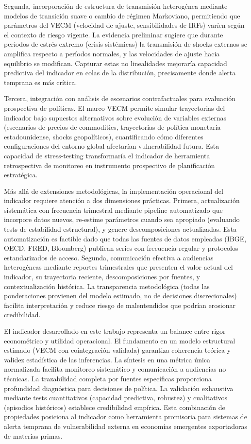 \documentclass[3p,11pt,draft,natbib=false]{elsarticle}
\begin{document}
Segunda, incorporación de estructura de transmisión heterogénea mediante modelos de transición suave o cambio de régimen Markoviano, permitiendo que parámetros del VECM (velocidad de ajuste, sensibilidades de IRFs) varíen según el contexto de riesgo vigente. La evidencia preliminar sugiere que durante períodos de estrés extremo (crisis sistémicas) la transmisión de shocks externos se amplifica respecto a períodos normales, y las velocidades de ajuste hacia equilibrio se modifican. Capturar estas no linealidades mejoraría capacidad predictiva del indicador en colas de la distribución, precisamente donde alerta temprana es más crítica.

Tercera, integración con análisis de escenarios contrafactuales para evaluación prospectiva de políticas. El marco VECM permite simular trayectorias del indicador bajo supuestos alternativos sobre evolución de variables externas (escenarios de precios de commodities, trayectorias de política monetaria estadounidense, shocks geopolíticos), cuantificando cómo diferentes configuraciones del entorno global afectarían vulnerabilidad futura. Esta capacidad de stress-testing transformaría el indicador de herramienta retrospectiva de monitoreo en instrumento prospectivo de planificación estratégica.

Más allá de extensiones metodológicas, la implementación operacional del indicador requiere atención a dos dimensiones prácticas. Primera, actualización sistemática con frecuencia trimestral mediante pipeline automatizado que incorpore datos nuevos, re-estime parámetros cuando sea apropiado (evaluando tests de estabilidad estructural), y genere descomposiciones actualizadas. Esta automatización es factible dado que todas las fuentes de datos empleadas (IBGE, OECD, FRED, Bloomberg) publican series con frecuencia regular y protocolos estandarizados de acceso. Segunda, comunicación efectiva a audiencias heterogéneas mediante reportes trimestrales que presenten el valor actual del indicador, su trayectoria reciente, descomposiciones por fuentes, y contextualización histórica. La transparencia metodológica (todas las ponderaciones provienen del modelo estimado, no de decisiones discrecionales) facilita interpretación y reduce riesgo de malentendidos que podrían erosionar credibilidad.

El indicador desarrollado en este trabajo representa un balance entre rigor econométrico y utilidad operacional. El fundamento en un modelo estructural estimado (VECM con cointegración validada) garantiza coherencia teórica y validez estadística de las inferencias. La síntesis en una métrica única normalizada facilita monitoreo sistemático y comunicación a audiencias no técnicas. La trazabilidad completa por fuentes específicas proporciona profundidad diagnóstica para decisiones de política. La validación exhaustiva mediante tests cuantitativos (capacidad predictiva, robustez) y cualitativos (episodios históricos) establece credibilidad empírica. Esta combinación de propiedades posiciona al indicador como herramienta promisoria para sistemas de alerta temprana de vulnerabilidad externa en economías emergentes exportadoras de materias primas.
\end{document}
